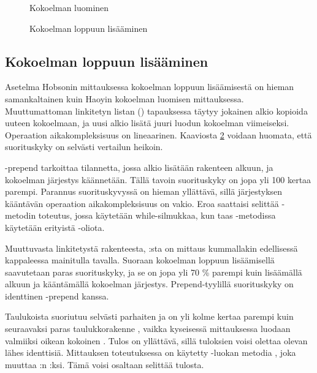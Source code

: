 \begin{figure}[h]
    \centering
    
    \caption{Kokoelman luominen}\label{kokoelmanLuominen_kaavio}
\end{figure}


\begin{figure}[h]
    \centering
    
    \caption{Kokoelman loppuun lisääminen}\label{kokoelmanLoppuunLisaaminen_kaavio}
\end{figure}

\subsection{Kokoelman loppuun lisääminen}
Asetelma Hobsonin mittauksessa\cite{hobsonBenchmark} kokoelman loppuun lisäämisestä on hieman samankaltainen kuin Haoyin\cite{haoyiBenchmark} kokoelman luomisen mittauksessa. Muuttumattoman linkitetyn listan () tapauksessa täytyy jokainen alkio kopioida uuteen kokoelmaan, ja uusi alkio lisätä juuri luodun kokoelman viimeiseksi. Operaation aikakompleksisuus on lineaarinen. Kaaviosta \ref{kokoelmanLoppuunLisaaminen_kaavio} voidaan huomata, että suorituskyky on selvästi vertailun heikoin.

-prepend tarkoittaa tilannetta, jossa alkio lisätään rakenteen alkuun, ja kokoelman järjestys käännetään. Tällä tavoin suorituskyky on jopa yli 100 kertaa parempi. Parannus suorituskyvyssä on hieman yllättävä, sillä järjestyksen kääntävän operaation aikakompleksisuus on vakio. Eroa saattaisi selittää -metodin toteutus, jossa käytetään while-silmukkaa, kun taas \code{:+}-metodissa käytetään erityistä -oliota.

Muuttuvasta linkitetystä rakenteesta, :sta on mittaus kummallakin edellisessä kappaleessa mainitulla tavalla. Suoraan kokoelman loppuun lisäämisellä saavutetaan paras suorituskyky, ja se on jopa yli 70 \% parempi kuin lisäämällä alkuun ja kääntämällä kokoelman järjestys. Prepend-tyylillä suorituskyky on identtinen -prepend kanssa. 

Taulukoista  suoriutuu selvästi parhaiten ja on yli kolme kertaa parempi kuin seuraavaksi paras taulukkorakenne , vaikka kyseisessä mittauksessa luodaan valmiiksi oikean kokoinen . Tulos on yllättävä, sillä tuloksien voisi olettaa olevan lähes identtisiä. Mittauksen \cite{hobsonBenchmark} toteutuksessa on käytetty -luokan metodia , joka muuttaa :n :ksi. Tämä voisi osaltaan selittää tulosta.

